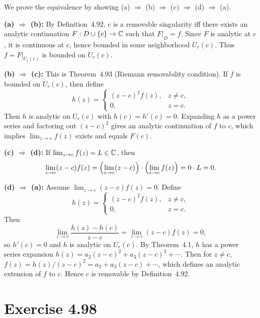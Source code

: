 \documentclass{article}
\begin{document}
\begin{solution}
  We prove the equivalence by showing (a) $\Rightarrow$ (b) $\Rightarrow$ (c) $\Rightarrow$ (d) $\Rightarrow$ (a).

  \medskip
  \noindent\textbf{(a) $\Rightarrow$ (b):}
  By Definition~4.92, $c$ is a removable singularity iff there exists an analytic
  continuation $F : D \cup \{c\} \to \mathbb{C}$ such that $F|_D = f$.
  Since $F$ is analytic at $c$, it is continuous at $c$, hence bounded in some
  neighborhood $U_r(c)$. Thus $f = F|_{\dot{U}_r(c)}$ is bounded on $\dot{U}_r(c)$.

  \medskip
  \noindent\textbf{(b) $\Rightarrow$ (c):}
  This is Theorem~4.93 (Riemann removability condition). If $f$ is bounded on
  $\dot{U}_r(c)$, then define
  \[
    h(z) =
    \begin{cases}
      (z - c)^2 f(z), & z \ne c,\\
      0, & z = c.
    \end{cases}
  \]
  Then $h$ is analytic on $U_r(c)$ with $h(c) = h'(c) = 0$. Expanding $h$ as a
  power series and factoring out $(z-c)^2$ gives an analytic continuation of $f$
  to $c$, which implies $\lim_{z \to c} f(z)$ exists and equals $F(c)$.

  \medskip
  \noindent\textbf{(c) $\Rightarrow$ (d):}
  If $\lim_{z \to c} f(z) = L \in \mathbb{C}$, then
  \[
    \lim_{z \to c} (z - c)f(z) = \Bigl(\lim_{z \to c} (z-c)\Bigr) \cdot
    \Bigl(\lim_{z \to c} f(z)\Bigr) = 0 \cdot L = 0.
  \]

  \medskip
  \noindent\textbf{(d) $\Rightarrow$ (a):}
  Assume $\lim_{z \to c} (z-c)f(z) = 0$. Define
  \[
    h(z) =
    \begin{cases}
      (z - c)^2 f(z), & z \ne c,\\
      0, & z = c.
    \end{cases}
  \]
  Then
  \[
    \lim_{z \to c} \frac{h(z) - h(c)}{z - c} = \lim_{z \to c} (z-c)f(z) = 0,
  \]
  so $h'(c) = 0$ and $h$ is analytic on $U_r(c)$. By Theorem~4.1, $h$ has a
  power series expansion $h(z) = a_2(z-c)^2 + a_3(z-c)^3 + \cdots$. Then for
  $z \ne c$, $f(z) = h(z)/(z-c)^2 = a_2 + a_3(z-c) + \cdots$, which defines
  an analytic extension of $f$ to $c$. Hence $c$ is removable by Definition~4.92.
\end{solution}

\section{Exercise 4.98}
\end{document}
